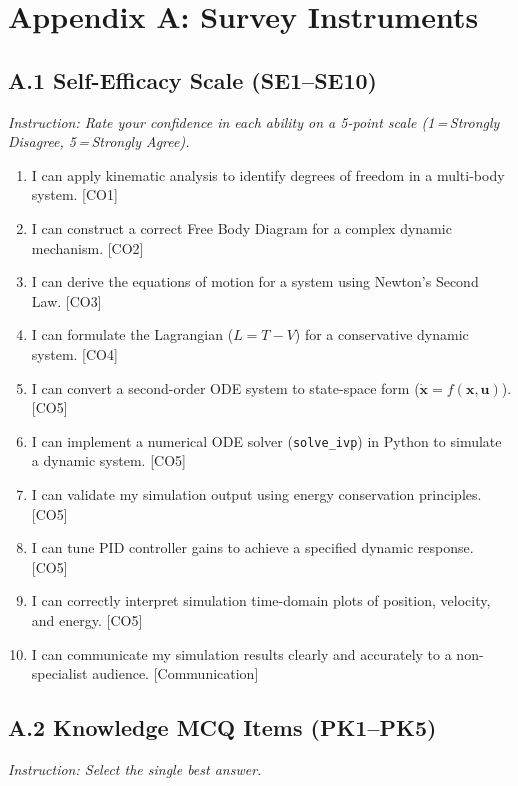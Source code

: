 \documentclass[utf8]{FrontiersinHarvard}
\begin{document}



\section*{Appendix A: Survey Instruments}

\subsection*{A.1 Self-Efficacy Scale (SE1--SE10)}
\textit{Instruction: Rate your confidence in each ability on a 5-point
scale (1\,=\,Strongly Disagree, 5\,=\,Strongly Agree).}

\begin{enumerate}\setlength{\itemsep}{2pt}\setlength{\parskip}{0pt}
  \item I can apply kinematic analysis to identify degrees of freedom
    in a multi-body system. [CO1]
  \item I can construct a correct Free Body Diagram for a complex
    dynamic mechanism. [CO2]
  \item I can derive the equations of motion for a system using
    Newton's Second Law. [CO3]
  \item I can formulate the Lagrangian ($L = T - V$) for a conservative
    dynamic system. [CO4]
  \item I can convert a second-order ODE system to state-space form
    ($\dot{\mathbf{x}} = f(\mathbf{x},\mathbf{u})$). [CO5]
  \item I can implement a numerical ODE solver (\texttt{solve\_ivp})
    in Python to simulate a dynamic system. [CO5]
  \item I can validate my simulation output using energy conservation
    principles. [CO5]
  \item I can tune PID controller gains to achieve a specified dynamic
    response. [CO5]
  \item I can correctly interpret simulation time-domain plots of
    position, velocity, and energy. [CO5]
  \item I can communicate my simulation results clearly and accurately
    to a non-specialist audience. [Communication]
\end{enumerate}

\subsection*{A.2 Knowledge MCQ Items (PK1--PK5)}
\textit{Instruction: Select the single best answer.}
\end{document}

